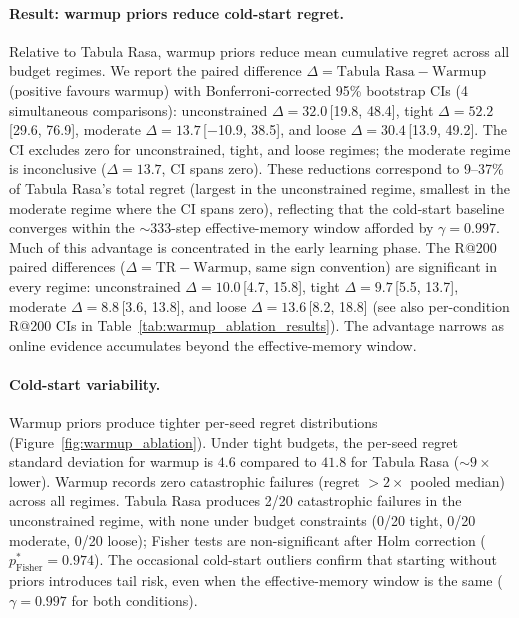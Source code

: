 \paragraph{Result: warmup priors reduce cold-start regret.}
Relative to Tabula Rasa, warmup priors reduce mean cumulative regret
across all budget regimes.
We report the paired difference
$\Delta = \text{Tabula Rasa} - \text{Warmup}$ (positive favours
warmup) with Bonferroni-corrected 95\% bootstrap CIs (4 simultaneous
comparisons):
unconstrained $\Delta{=}32.0$\,[19.8, 48.4],
tight $\Delta{=}52.2$\,[29.6, 76.9],
moderate $\Delta{=}13.7$\,[$-$10.9, 38.5],
and loose $\Delta{=}30.4$\,[13.9, 49.2].
The CI excludes zero for unconstrained, tight, and loose regimes;
the moderate regime is inconclusive ($\Delta{=}13.7$, CI spans zero).
These reductions correspond to 9--37\% of Tabula Rasa's total regret
(largest in the unconstrained regime, smallest in the moderate regime
where the CI spans zero), reflecting that the cold-start baseline
converges within the ${\sim}333$-step effective-memory window
afforded by $\gamma{=}0.997$.
Much of this advantage is concentrated in the early learning phase.
The R@200 paired differences
($\Delta = \text{TR} - \text{Warmup}$, same sign convention)
are significant in every regime:
unconstrained $\Delta{=}10.0$\,[4.7, 15.8],
tight $\Delta{=}9.7$\,[5.5, 13.7],
moderate $\Delta{=}8.8$\,[3.6, 13.8],
and loose $\Delta{=}13.6$\,[8.2, 18.8]
(see also per-condition R@200 CIs in
Table~\ref{tab:warmup_ablation_results}).
The advantage narrows as online evidence accumulates beyond the
effective-memory window.

\paragraph{Cold-start variability.}
Warmup priors produce tighter per-seed regret distributions
(Figure~\ref{fig:warmup_ablation}).
Under tight budgets, the per-seed regret standard deviation for
warmup is $4.6$ compared to $41.8$ for Tabula Rasa
(${\sim}9{\times}$ lower).
Warmup records zero catastrophic failures
(regret $> 2{\times}$ pooled median) across all regimes.
Tabula Rasa produces 2/20 catastrophic failures in the
unconstrained regime, with none under budget constraints
(0/20 tight, 0/20 moderate, 0/20 loose); Fisher tests are
non-significant after Holm correction
($p^*_{\text{Fisher}} = 0.974$).
The occasional cold-start outliers confirm that starting without
priors introduces tail risk, even when the effective-memory window
is the same ($\gamma{=}0.997$ for both conditions).


